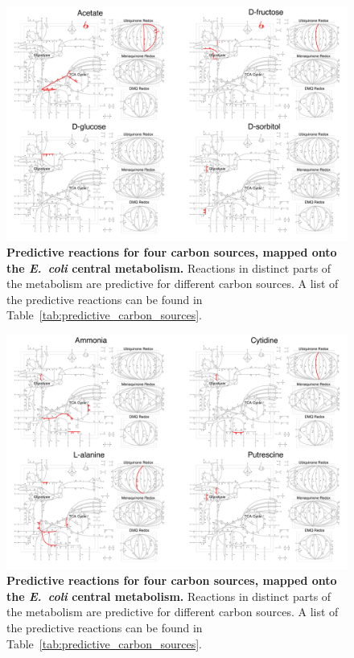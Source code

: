 \documentclass[12pt]{article}
\begin{document}
\clearpage
\begin{figure}[p]
\centerline{\includegraphics[width=7in]{Figures/carbon/carbon_grid.pdf}}
\caption{\label{fig:carbon_network}\textbf{Predictive reactions for four carbon sources, mapped onto the \emph{E.\ coli} central metabolism.} Reactions in distinct parts of the metabolism are predictive for different carbon sources. A list of the predictive reactions can be found in Table~\ref{tab:predictive_carbon_sources}.}
\end{figure}

\clearpage
\begin{figure}[p]
\centerline{\includegraphics[width=7in]{Figures/nitrogen/nitrogen_grid.pdf}}
\caption{\label{fig:nitrogen_network}\textbf{Predictive reactions for four carbon sources, mapped onto the \emph{E.\ coli} central metabolism.} Reactions in distinct parts of the metabolism are predictive for different carbon sources. A list of the predictive reactions can be found in Table~\ref{tab:predictive_carbon_sources}.}
\end{figure}
\end{document}
